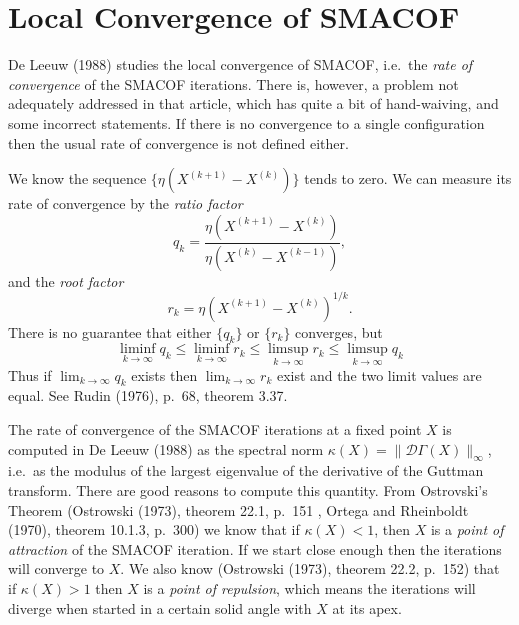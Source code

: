 \documentclass[
  12pt,
]{article}
\begin{document}
\section{Local Convergence of SMACOF}\label{local-convergence-of-smacof}

De Leeuw (1988) studies the local convergence of SMACOF, i.e.~the \emph{rate of convergence} of the SMACOF iterations. There is, however, a problem not adequately addressed in that article, which has quite a bit of hand-waiving, and some incorrect statements. If there is no convergence to a single configuration then the usual rate of convergence is not defined either.

We know the sequence \(\{\eta(X^{(k+1)}-X^{(k)})\}\) tends to zero. We can measure its rate of convergence by the \emph{ratio factor}
\begin{equation}
q_k=\frac{\eta(X^{(k+1)}-X^{(k)})}{\eta(X^{(k)}-X^{(k-1)})},
\end{equation}
and the \emph{root factor}
\begin{equation}
r_k=\eta(X^{(k+1)}-X^{(k)})^{1/k}.
\end{equation}
There is no guarantee that either \(\{q_k\}\) or \(\{r_k\}\) converges, but
\begin{equation}
\liminf_{k\rightarrow\infty} q_k\leq\liminf_{k\rightarrow\infty} r_k\leq\limsup_{k\rightarrow\infty} r_k\leq\limsup_{k\rightarrow\infty} q_k
\end{equation}
Thus if \(\lim_{k\rightarrow\infty} q_k\) exists then \(\lim_{k\rightarrow\infty} r_k\) exist and the two limit values are equal. See Rudin (1976), p.~68, theorem 3.37.

The rate of convergence of the SMACOF iterations at a fixed point \(X\) is computed in De Leeuw (1988) as the spectral norm \(\kappa(X)=\|\mathcal{D}\Gamma(X)\|_\infty\), i.e.~as the modulus of the largest eigenvalue of the derivative of the Guttman transform.
There are good reasons to compute this quantity. From Ostrovski's Theorem (Ostrowski (1973), theorem 22.1, p.~151 , Ortega and Rheinboldt (1970), theorem 10.1.3, p.~300) we know that if \(\kappa(X)<1\), then \(X\) is a \emph{point of attraction} of the SMACOF iteration. If we start close enough then the iterations will converge to \(X\). We also know (Ostrowski (1973), theorem 22.2, p.~152) that if \(\kappa(X)>1\) then \(X\) is a \emph{point of repulsion}, which means the iterations will diverge when started in a certain solid angle with \(X\) at its apex.
\end{document}
